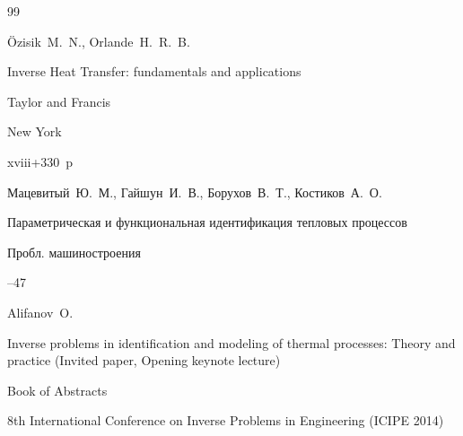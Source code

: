 \begin{thebibliography}{99}




\by \"Ozisik~M.~N., Orlande~H.~R.~B.

\book Inverse Heat Transfer: fundamentals and applications


\publ Taylor and Francis

\publaddr New York

\totalpages xviii+330~p \nofrills





\by Мацевитый~Ю.~М., Гайшун~И.~В., Борухов~В.~Т., Костиков~А.~О.

\paper Параметрическая и функциональная идентификация тепловых процессов

\jour Пробл. машиностроения




--47
















\by Alifanov~O.

\paper Inverse problems in identification and modeling of thermal processes: Theory and practice (Invited paper, Opening keynote lecture)

\inbook Book of Abstracts

\bookinfo 8th International Conference on Inverse Problems in Engineering (ICIPE 2014)


\end{thebibliography}
